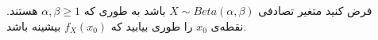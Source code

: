 \problem{}
فرض کنید متغیر تصادفی
$X \sim {Beta}(\alpha, \beta)$
باشد به طوری که 
$\alpha, \beta \geq 1$
هستند. 
نقطه‌ی 
$x_0$
را طوری بیابید که
$f_X(x_0)$
بیشینه باشد.